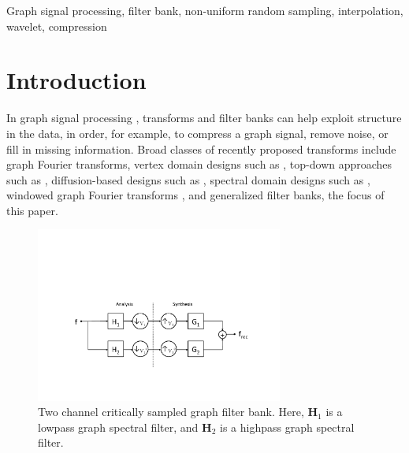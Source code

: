 \documentclass[journal, 10pt]{IEEEtran}
\begin{document}
\begin{IEEEkeywords}
Graph signal processing, filter bank, non-uniform random sampling, interpolation, wavelet, compression
\end{IEEEkeywords}
%

\section{Introduction}

In graph signal processing \cite{shuman2013emerging}, transforms and filter banks can help exploit structure in the data, in order, for example, 
to compress a graph signal, remove noise, or fill in missing information. 
Broad classes of recently proposed transforms include graph Fourier transforms, vertex domain designs such as \cite{Crovella2003,wang}, top-down approaches such as \cite{szlam,gavish,irion}, diffusion-based designs such as \cite{coifman2006diffusion,Maggioni_biorthogonal}, spectral domain designs such as \cite{hammond2011wavelets,shuman2013spectrum}, windowed graph Fourier transforms  \cite{shuman2015vertex}, and generalized filter banks, %
the focus of this paper. %


\begin{figure}[t]
\centerline{\includegraphics[width=3.2in]{fig_two_channel_classical}}
\caption{Two channel critically sampled graph filter bank. 
Here, $\mathbf{H}_1$ is a lowpass graph spectral filter, and $\mathbf{H}_2$ is a highpass graph spectral filter.}\label{Fig:two_channel}
\end{figure}
\end{document}

